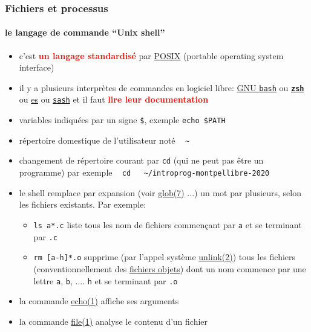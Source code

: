 \documentclass[xcolor=svgnames,final,smaller,a4]{beamer}
\begin{document}
\begin{frame}
  \frametitle{Fichiers et processus}
  \framesubtitle{le langage de commande ``Unix shell''}

  \begin{relsize}{-1}
  \begin{itemize}

  \item c'est \textbf{\textcolor{red}{un langage standardisé}} par \href{https://fr.wikipedia.org/wiki/POSIX}{POSIX} (portable operating system interface)
    
  \item il y a plusieurs interprètes de commandes en logiciel libre: \href{https://www.gnu.org/software/bash/}{GNU \texttt{bash}} ou \href{https://zsh.org/}{\texttt{\textbf{zsh}}} ou \href{https://wryun.github.io/es-shell/}{es} ou \href{https://en.wikipedia.org/wiki/Stand-alone_shell}{\texttt{sash}} et il faut  \textbf{\textcolor{red}{lire leur documentation}} 

  \item variables indiquées par un signe \texttt{\$}, exemple \texttt{echo \${PATH}}

  \item répertoire domestique de l'utilisateur noté ~ \texttt{\~}


  \item changement de répertoire courant par  \texttt{cd} (qui ne peut pas être un programme) par exemple ~ \texttt{cd ~ \~\!/introprog-montpellibre-2020}


  \item le shell remplace par expansion (voir \href{https://man7.org/linux/man-pages/man7/glob.7.html}{glob(7)} ...) un mot par plusieurs, selon les fichiers existants. Par exemple:

     \begin{itemize}
     \item \texttt{ls a*.c} liste tous les nom de fichiers commençant par \texttt{a} et se terminant par \texttt{.c}

     \item \texttt{rm [a-h]*.o} supprime (par l'appel système
       \href{https://man7.org/linux/man-pages/man2/unlink.2.html}{unlink(2)})
       tous les fichiers (conventionnellement des
       \href{https://fr.wikipedia.org/wiki/Fichier_objet}{fichiers
         objets}) dont un nom commence par une lettre \texttt{a},
       \texttt{b}, .... \texttt{h} et se terminant par \texttt{.o}
     \end{itemize}

   \item la commande \href{https://man7.org/linux/man-pages/man1/echo.1.html}{echo(1)} affiche ses arguments
     
   \item la commande \href{https://man7.org/linux/man-pages/man1/file.1.html}{file(1)} analyse le contenu d'un fichier
     
  \end{itemize}

\end{relsize}

\end{frame}
    
\end{document}
